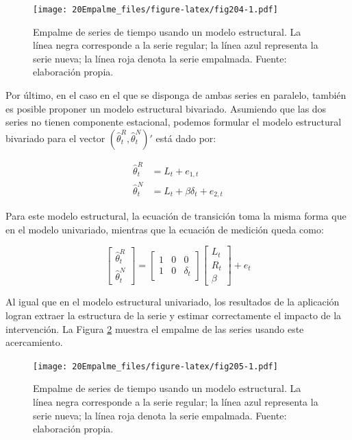 \documentclass[
  12pt,
]{book}
\begin{document}
\begin{figure}
\centering
\texttt{[image: 20Empalme\_files/figure-latex/fig204-1.pdf]}
\caption{\label{fig:fig204}Empalme de series de tiempo usando un modelo estructural. La línea negra corresponde a la serie regular; la línea azul representa la serie nueva; la línea roja denota la serie empalmada. Fuente: elaboración propia.}
\end{figure}

Por último, en el caso en el que se disponga de ambas series en paralelo, también es posible proponer un modelo estructural bivariado. Asumiendo que las dos series no tienen componente estacional, podemos formular el modelo estructural bivariado para el vector \((\hat \theta^{R}_t,\hat \theta^{N}_t)'\) está dado por:

\[
\begin{aligned}
\hat \theta^{R}_t &= L_t+e_{1,t} \\
\hat \theta^{N}_t &= L_t+\beta\delta_t+e_{2,t}
\end{aligned}
\]

Para este modelo estructural, la ecuación de transición toma la misma forma que en el modelo univariado, mientras que la ecuación de medición queda como:

\[
\begin{bmatrix}\hat \theta^{R}_t\\\hat \theta^{N}_t\end{bmatrix}=\begin{bmatrix}
1&0&0\\
1&0&\delta_t
\end{bmatrix}\begin{bmatrix}
L_t\\
R_t\\
\beta
\end{bmatrix}+e_t
\]

Al igual que en el modelo estructural univariado, los resultados de la aplicación logran extraer la estructura de la serie y estimar correctamente el impacto de la intervención. La Figura \ref{fig:fig205} muestra el empalme de las series usando este acercamiento.

\begin{figure}
\centering
\texttt{[image: 20Empalme\_files/figure-latex/fig205-1.pdf]}
\caption{\label{fig:fig205}Empalme de series de tiempo usando un modelo estructural. La línea negra corresponde a la serie regular; la línea azul representa la serie nueva; la línea roja denota la serie empalmada. Fuente: elaboración propia.}
\end{figure}
\end{document}
